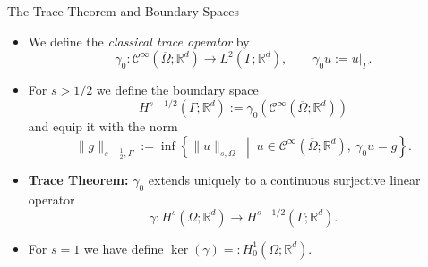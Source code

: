 \documentclass[10pt,aspectratio=169]{beamer}
\def\R{{\mathbb R}}
\def\cC{{\mathcal C}}
\begin{document}
\begin{frame}{The Trace Theorem and Boundary Spaces}
	\begin{itemize}
		\item We define the {\em classical trace operator} by
		      \begin{equation*}
			      \gamma_0:\cC^\infty(\overline{\Omega};\R^d)\to L^2(\Gamma;\R^d),
			      \qquad
			      \gamma_0 u:=u|_\Gamma.
		      \end{equation*}
		\item For $s>1/2$ we define the boundary space
		      \begin{equation*}
			      H^{s-1/2}(\Gamma;\R^d):= \gamma_0(\cC^\infty(\overline{\Omega};\R^d))
		      \end{equation*}
		      and equip it with the norm
		      \begin{equation*}
			      \|g\|_{s-\tfrac12,\Gamma}
			      :=
			      \inf\left\{
			      \|u\|_{s,\Omega}
			      \;\middle|\;
			      u\in \cC^\infty(\overline{\Omega};\R^d),\ \gamma_0 u=g
			      \right\}.
		      \end{equation*}
		\item {\bf Trace Theorem: } $\gamma_0$ extends uniquely to a continuous surjective linear operator
		      \begin{equation*}
			      \gamma: H^s(\Omega;\R^d)\to H^{s-1/2}(\Gamma;\R^d).
		      \end{equation*}
		\item For $s=1$ we have define $\ker(\gamma)=:H_0^1(\Omega;\R^d)$.
	\end{itemize}
\end{frame}
\end{document}
